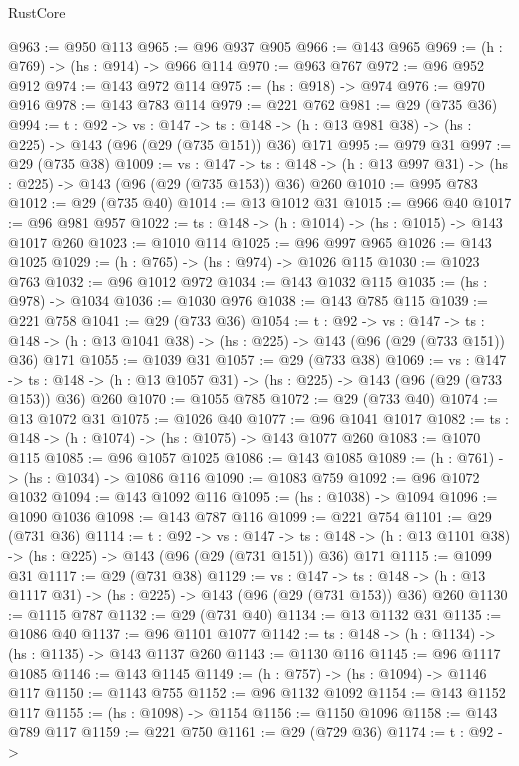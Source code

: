 \begin{lexlean}{RustCore}
\begin{coremodule}
@963 := @950 @113
@965 := @96 @937 @905
@966 := @143 @965
@969 := (h : @769) -> (hs : @914) -> @966 @114
@970 := @963 @767
@972 := @96 @952 @912
@974 := @143 @972 @114
@975 := (hs : @918) -> @974
@976 := @970 @916
@978 := @143 @783 @114
@979 := @221 @762
@981 := @29 (@735 @36)
@994 := {t : @92} ->
  {vs : @147} ->
  {ts : @148} -> (h : @13 @981 @38) -> (hs : @225) -> @143 (@96 (@29 (@735 @151)) @36) @171
@995 := @979 @31
@997 := @29 (@735 @38)
@1009 := {vs : @147} ->
  {ts : @148} -> (h : @13 @997 @31) -> (hs : @225) -> @143 (@96 (@29 (@735 @153)) @36) @260
@1010 := @995 @783
@1012 := @29 (@735 @40)
@1014 := @13 @1012 @31
@1015 := @966 @40
@1017 := @96 @981 @957
@1022 := {ts : @148} -> (h : @1014) -> (hs : @1015) -> @143 @1017 @260
@1023 := @1010 @114
@1025 := @96 @997 @965
@1026 := @143 @1025
@1029 := (h : @765) -> (hs : @974) -> @1026 @115
@1030 := @1023 @763
@1032 := @96 @1012 @972
@1034 := @143 @1032 @115
@1035 := (hs : @978) -> @1034
@1036 := @1030 @976
@1038 := @143 @785 @115
@1039 := @221 @758
@1041 := @29 (@733 @36)
@1054 := {t : @92} ->
  {vs : @147} ->
  {ts : @148} -> (h : @13 @1041 @38) -> (hs : @225) -> @143 (@96 (@29 (@733 @151)) @36) @171
@1055 := @1039 @31
@1057 := @29 (@733 @38)
@1069 := {vs : @147} ->
  {ts : @148} -> (h : @13 @1057 @31) -> (hs : @225) -> @143 (@96 (@29 (@733 @153)) @36) @260
@1070 := @1055 @785
@1072 := @29 (@733 @40)
@1074 := @13 @1072 @31
@1075 := @1026 @40
@1077 := @96 @1041 @1017
@1082 := {ts : @148} -> (h : @1074) -> (hs : @1075) -> @143 @1077 @260
@1083 := @1070 @115
@1085 := @96 @1057 @1025
@1086 := @143 @1085
@1089 := (h : @761) -> (hs : @1034) -> @1086 @116
@1090 := @1083 @759
@1092 := @96 @1072 @1032
@1094 := @143 @1092 @116
@1095 := (hs : @1038) -> @1094
@1096 := @1090 @1036
@1098 := @143 @787 @116
@1099 := @221 @754
@1101 := @29 (@731 @36)
@1114 := {t : @92} ->
  {vs : @147} ->
  {ts : @148} -> (h : @13 @1101 @38) -> (hs : @225) -> @143 (@96 (@29 (@731 @151)) @36) @171
@1115 := @1099 @31
@1117 := @29 (@731 @38)
@1129 := {vs : @147} ->
  {ts : @148} -> (h : @13 @1117 @31) -> (hs : @225) -> @143 (@96 (@29 (@731 @153)) @36) @260
@1130 := @1115 @787
@1132 := @29 (@731 @40)
@1134 := @13 @1132 @31
@1135 := @1086 @40
@1137 := @96 @1101 @1077
@1142 := {ts : @148} -> (h : @1134) -> (hs : @1135) -> @143 @1137 @260
@1143 := @1130 @116
@1145 := @96 @1117 @1085
@1146 := @143 @1145
@1149 := (h : @757) -> (hs : @1094) -> @1146 @117
@1150 := @1143 @755
@1152 := @96 @1132 @1092
@1154 := @143 @1152 @117
@1155 := (hs : @1098) -> @1154
@1156 := @1150 @1096
@1158 := @143 @789 @117
@1159 := @221 @750
@1161 := @29 (@729 @36)
@1174 := {t : @92} ->

\end{coremodule}
\end{lexlean}
